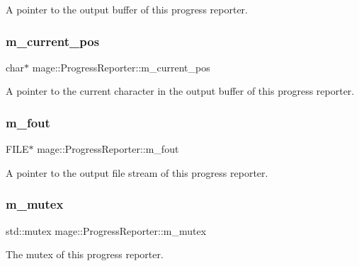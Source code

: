 A pointer to the output buffer of this progress reporter. \hypertarget{classmage_1_1_progress_reporter_a7adafaaf90edf29c8c27f4008aea41c9}{}\label{classmage_1_1_progress_reporter_a7adafaaf90edf29c8c27f4008aea41c9} 
\subsubsection{\texorpdfstring{m\+\_\+current\+\_\+pos}{m\_current\_pos}}
{\footnotesize\ttfamily char$\ast$ mage\+::\+Progress\+Reporter\+::m\+\_\+current\+\_\+pos\hspace{0.3cm}{\ttfamily [private]}}

A pointer to the current character in the output buffer of this progress reporter. \hypertarget{classmage_1_1_progress_reporter_ad325ee5978fd1d16a97acbe37a977982}{}\label{classmage_1_1_progress_reporter_ad325ee5978fd1d16a97acbe37a977982} 
\subsubsection{\texorpdfstring{m\+\_\+fout}{m\_fout}}
{\footnotesize\ttfamily F\+I\+LE$\ast$ mage\+::\+Progress\+Reporter\+::m\+\_\+fout\hspace{0.3cm}{\ttfamily [private]}}

A pointer to the output file stream of this progress reporter. \hypertarget{classmage_1_1_progress_reporter_aa6e43cc3c1d56eea9cb3741f05616ac8}{}\label{classmage_1_1_progress_reporter_aa6e43cc3c1d56eea9cb3741f05616ac8} 
\subsubsection{\texorpdfstring{m\+\_\+mutex}{m\_mutex}}
{\footnotesize\ttfamily std\+::mutex mage\+::\+Progress\+Reporter\+::m\+\_\+mutex\hspace{0.3cm}{\ttfamily [private]}}

The mutex of this progress reporter. \hypertarget{classmage_1_1_progress_reporter_ac34bdbf59366144a97780d979cad8167}{}\label{classmage_1_1_progress_reporter_ac34bdbf59366144a97780d979cad8167} 
